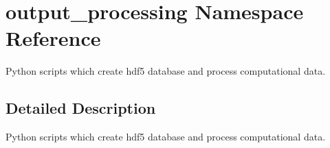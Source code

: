 \hypertarget{namespaceoutput__processing}{\section{output\-\_\-processing Namespace Reference}
\label{namespaceoutput__processing}
}


Python scripts which create hdf5 database and process computational data.  




\subsection{Detailed Description}
Python scripts which create hdf5 database and process computational data. 